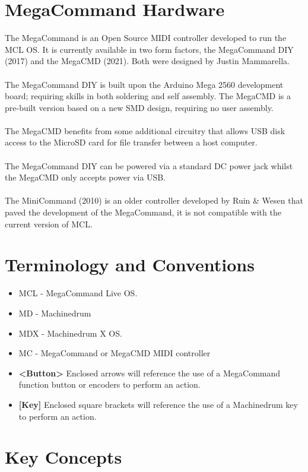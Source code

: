 \chapter{MegaCommand Hardware}
The MegaCommand is an Open Source MIDI controller developed to run the MCL OS. It is currently available in two form factors, the MegaCommand DIY (2017) and the MegaCMD (2021). Both were designed by Justin Mammarella.\\\\
The MegaCommand DIY is built upon the Arduino Mega 2560 development board; requiring skills in both soldering and self assembly. The MegaCMD is a pre-built version based on a new SMD design, requiring no user assembly.\\\\
The MegaCMD benefits from some additional circuitry that allows USB disk access to the MicroSD card for file transfer between a host computer.\\\\
The MegaCommand DIY can be powered via a standard DC power jack whilst the MegaCMD only accepts power via USB.
\\\\
The MiniCommand (2010) is an older controller developed by Ruin \& Wesen that paved the development of the MegaCommand, it is not compatible with the current version of MCL.
\chapter{Terminology and Conventions}
   \begin{itemize}
      \item MCL - MegaCommand Live OS.
      \item MD - Machinedrum
      \item MDX - Machinedrum X OS.
      \item MC - MegaCommand or MegaCMD MIDI controller
      \item \textbf{<Button> } Enclosed arrows will reference the use of a MegaCommand function button or encoders to perform an action.
      \item \textbf{[Key] } Enclosed square brackets will reference the use of a Machinedrum key to perform an action. 
   \end{itemize}


\newpage
\chapter{Key Concepts}

